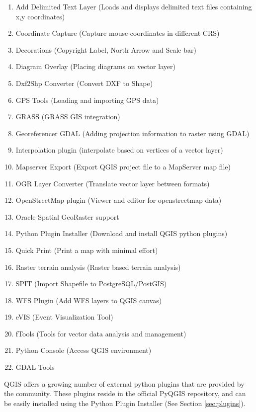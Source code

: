 
\begin{enumerate}
\item Add Delimited Text Layer (Loads and displays delimited text files
containing x,y coordinates)
\item Coordinate Capture (Capture mouse coordinates in different CRS)
\item Decorations (Copyright Label, North Arrow and Scale bar)
\item Diagram Overlay (Placing diagrams on vector layer)
\item Dxf2Shp Converter (Convert DXF to Shape)
\item GPS Tools (Loading and importing GPS data)
\item GRASS (GRASS GIS integration)
\item Georeferencer GDAL (Adding projection information to raster using GDAL)
\item Interpolation plugin (interpolate based on vertices of a vector layer)
\item Mapserver Export (Export QGIS project file to a MapServer map file)
\item OGR Layer Converter (Translate vector layer between formats)
\item OpenStreetMap plugin (Viewer and editor for openstreetmap data)
\item Oracle Spatial GeoRaster support
\item Python Plugin Installer (Download and install QGIS python plugins)
\item Quick Print (Print a map with minimal effort)
\item Raster terrain analysis (Raster based terrain analysis)
\item SPIT (Import Shapefile to PostgreSQL/PostGIS)
\item WFS Plugin (Add WFS layers to QGIS canvas)
\item eVIS (Event Visualization Tool)
\item fTools (Tools for vector data analysis and management)
\item Python Console (Access QGIS environment)
\item GDAL Tools
\end{enumerate}


QGIS offers a growing number of external python plugins that are provided by
the community. These plugins reside in the official PyQGIS repository, and
can be easily installed using the Python Plugin Installer (See Section
\ref{sec:plugins}).

